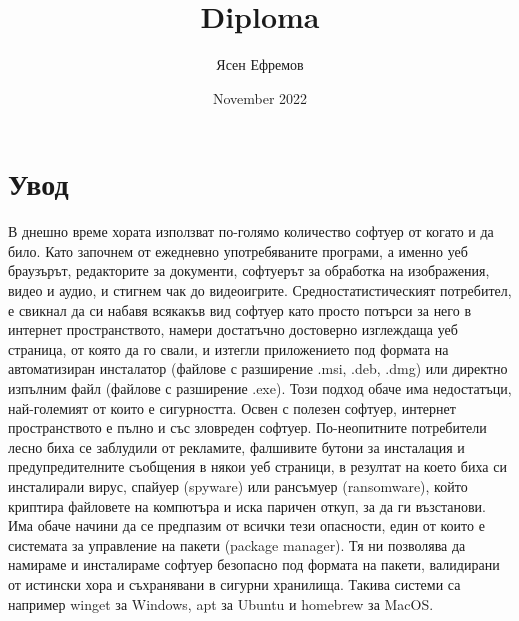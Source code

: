\documentclass[14pt]{extreport}
\title{Diploma}
\author{Ясен Ефремов}
\date{November 2022}
\begin{document}
\maketitle

\chapter*{Увод}

В днешно време хората използват по-голямо количество софтуер от когато и да
било. Като започнем от ежедневно употребяваните програми, а именно уеб
браузърът, редакторите за документи, софтуерът за обработка на изображения,
видео и аудио, и стигнем чак до видеоигрите. Средностатистическият потребител,
е свикнал да си набавя всякакъв вид софтуер като просто потърси за него в
интернет пространството, намери достатъчно достоверно изглеждаща уеб страница,
от която да го свали, и изтегли приложението под формата на автоматизиран
инсталатор (файлове с разширение .msi, .deb, .dmg) или директно изпълним файл
(файлове с разширение .exe). Този подход обаче има недостатъци, най-големият от
които е сигурността. Освен с полезен софтуер, интернет пространството е пълно и
със зловреден софтуер. По-неопитните потребители лесно биха се заблудили от
рекламите, фалшивите бутони за инсталация и предупредителните съобщения в някои
уеб страници, в резултат на което биха си инсталирали вирус, спайуер (spyware)
или рансъмуер (ransomware), който криптира файловете на компютъра и иска паричен
откуп, за да ги възстанови. Има обаче начини да се предпазим от всички тези
опасности, един от които е системата за управление на пакети (package manager).
Тя ни позволява да намираме и инсталираме софтуер безопасно под формата на
пакети, валидирани от истински хора и съхранявани в сигурни хранилища. Такива
системи са например winget за Windows, apt за Ubuntu и homebrew за MacOS.
\end{document}

